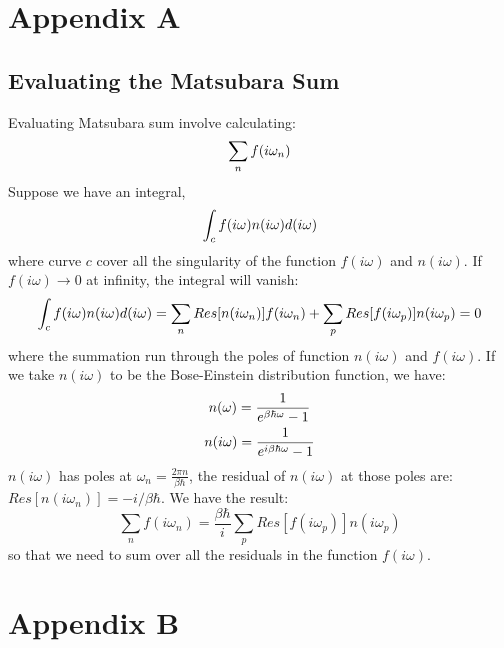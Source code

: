 \documentclass{article}
\begin{document}
\pagebreak
\section*{Appendix A}
\subsection*{Evaluating the Matsubara Sum}
Evaluating Matsubara sum involve calculating:
\begin{equation}
    \sum_n f(i\omega_n) \notag
\end{equation}
Suppose we have an integral,
\begin{equation}
    \int_c f(i\omega) n(i\omega) d(i\omega) \notag
\end{equation}
where curve $c$ cover all the singularity of the function $f(i\omega)$ and $n(i\omega)$.
If $f(i\omega) \to 0$ at infinity, the integral will vanish:
\begin{equation}
    \int_c f(i\omega) n(i\omega) d(i\omega) = \sum_n Res[n(i\omega_n)] f(i\omega_n) + \sum_p Res[f(i\omega_p)] n(i\omega_p) = 0 \notag
\end{equation}
where the summation run through the poles of function $n(i\omega)$ and $f(i\omega)$. 
If we take $n(i\omega)$ to be the Bose-Einstein distribution function, we have:
\begin{gather}
    n(\omega) = \frac{1}{e^{\beta\hbar\omega} - 1} \notag \\
    n(i\omega) = \frac{1}{e^{i\beta\hbar\omega} - 1} \notag
\end{gather}
$n(i\omega)$ has poles at $\omega_n = \frac{2\pi n}{\beta\hbar}$, the residual of $n(i\omega)$ at those poles 
are: $Res[n(i\omega_n)] = -i/\beta\hbar$. We have the result:
\begin{equation}
    \sum_n f(i\omega_n) = \frac{\beta\hbar}{i} \sum_{p} Res[f(i\omega_p)] n(i\omega_p)
\end{equation}
so that we need to sum over all the residuals in the function $f(i\omega)$.

\pagebreak
\section*{Appendix B}
\end{document}

